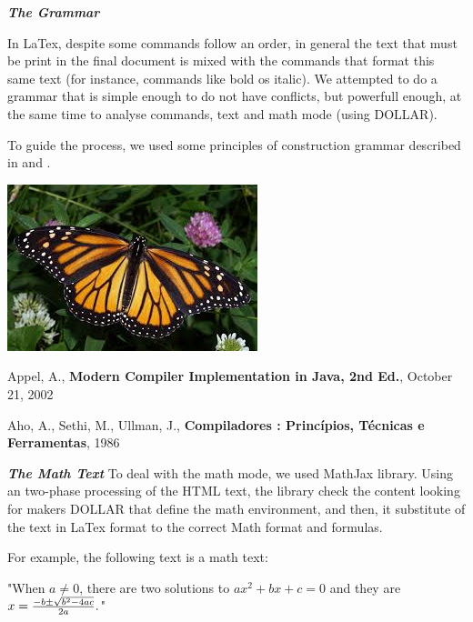 \documentclass{article}
\begin{document}
\textit{\textbf{The Grammar}}

In LaTex, despite some commands follow an order, in general the text that must be print in the final document is mixed with the commands that format this same text (for instance, commands like bold os italic). We attempted to do a grammar that is simple enough to do not have conflicts, but powerfull enough, at the same time to analyse commands, text and math mode (using DOLLAR).

To guide the process, we used some principles of construction grammar described in \cite{Appel02} and \cite{Aho86}.

\includegraphics{monarch.jpg}

\begin{thebibliography}

 Appel, A., \textbf{Modern Compiler Implementation in Java, 2nd Ed.}, October 21, 2002

 Aho, A., Sethi, M., Ullman, J., \textbf{Compiladores : Princípios, Técnicas e Ferramentas}, 1986

\end{thebibliography}

\textit{\textbf{The Math Text}}
To deal with the math mode, we used MathJax library. Using an two-phase processing of the HTML text, the library check the content looking for makers DOLLAR that define the math environment, and then, it substitute of the text in LaTex format to the correct Math format and formulas.

For example, the following text is a math text:

"When $a \ne 0$, there are two solutions to $ax^2 + bx + c = 0$ and they are $x = {-b \pm \sqrt{b^2-4ac} \over 2a}.$"
\end{document}
